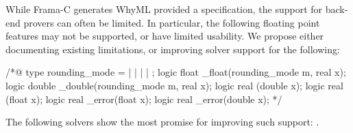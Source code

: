 While Frama-C generates WhyML provided a specification, the support for back-end provers can often be limited. In particular, the following floating point features may not be supported, or have limited usability. We propose either documenting existing limitations, or improving solver support for the following:

\clearpage

\begin{listing-nonumber}
/*@
type rounding_mode = \Up | \Down | \ToZero | \NearestAway | \NearestEven;
logic float \round_float(rounding_mode m, real x);
logic double \round_double(rounding_mode m, real x);
logic real \exact(double x);
logic real \exact(float x);
logic real \round_error(float x);
logic real \round_error(double x);
*/
\end{listing-nonumber}

The following solvers show the most promise for improving such support: .


% 
% 
% 

